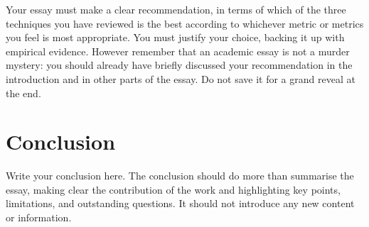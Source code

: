 \documentclass{scrartcl}
\begin{document}
Your essay must make a clear recommendation, in terms of which of the three techniques you have reviewed is the best according to whichever metric or metrics you feel is most appropriate. You must justify your choice, backing it up with empirical evidence. However remember that an academic essay is not a murder mystery: you should already have briefly discussed your recommendation in the introduction and in other parts of the essay. Do not save it for a grand reveal at the end.

\section{Conclusion}

Write your conclusion here. The conclusion should do more than summarise the essay, making clear the contribution of the work and highlighting key points, limitations, and outstanding questions. It should not introduce any new content or information. \cite{GDCVault} \cite{youtube} \cite{UE4} \cite{nicolau2016evolutionary} \cite{nareyek2004ai}



\end{document}
